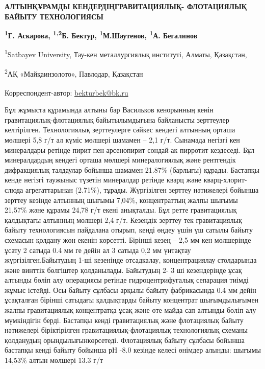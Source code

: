 

{\bfseries АЛТЫНҚҰРАМДЫ КЕНДЕРДІҢГРАВИТАЦИЯЛЫҚ- ФЛОТАЦИЯЛЫҚ БАЙЫТУ
ТЕХНОЛОГИЯСЫ}

{\bfseries \textsuperscript{1}Г. Аскарова, \textsuperscript{1,2}Б.
Бектур\textsuperscript{\envelope }, \textsuperscript{1}М.Шаутенов,
\textsuperscript{1}А. Бегалинов}

\textsuperscript{1}Satbayev University, Тау-кен металлургиялық
институті, Алматы, Қазақстан,

\textsuperscript{2}АҚ «Майқаинзолото», Павлодар, Қазақстан

{\bfseries \textsuperscript{\envelope }}Корреспондент-автор:
\href{mailto:bekturbek@bk.run}{bekturbek@bk.ru}

Бұл жұмыста құрамында алтыны бар Васильков кенорынның кенін
гравитациялық-флотациялық байытылымдығына байланысты зерттеулер
келтірілген. Технологиялық зерттеулерге сәйкес кендегі алтынның орташа
мөлшері 5,8 г/т ал күміс мөлшері шамамен -- 2,1 г/т. Сынамада негізгі
кен минералдары ретінде пирит пен арсенопирит сондай-ак пирротит
кездеседі. Бұл минералдардың кендегі орташа мөлшері минералогиялық және
рентгендік дифракциялық талдаулар бойынша шамамен 21.87\% (барлығы)
құрады. Бастапқы кенде негізгі таужыныс түзетін минералдар ретінде кварц
және кварц-хлорит-слюда агрегаттарынан (2.71\%), тұрады. Жүргізілген
зерттеу нәтижелері бойынша зерттеу кезінде алтынның шығымы 7,04\%,
концентраттың жалпы шығымы 21,57\% және құрамы 24,78 г/т екені
анықталды. Бұл ретте гравитациялық қалдықтағы алтынның мөлшері 2,4 г/т.
Кезеңдік зерттеу тек гравитациялық байыту технологиясын пайдалана
отырып, кенді өңдеу үшін үш сатылы байыту схемасын қолдану жөн екенін
көрсетті. Бірінші кезең -- 2,5 мм кен мөлшерінде ұсату 2 сатыда 0.4 мм
ге дейін ал 3 сатыда 0,2 мм үнтақтау жүргізілген.Байытудың 1-ші
кезенінде отсадкалау, концентрациялау столдарында және винттік бөлгіштер
қолданылады. Байытудың 2- 3 ші кезендерінде ұсақ алтынды бөліп алу
операциясы ретінде гидроцентрифугалық сепарация тиімді жұмыс істейді.
Осы байыту сұлбасы арқылы байыту фабрикасында 0.4 мм дейін ұсақталған
бірінші сатыдағы қалдықтарды байыту концентрат шығымдылығымен жалпы
гравитациялық концентратқа ұсақ және өте майда сап алтынды бөліп алу
мүмкіндігін берді. Бастапқы кенді гравитациялық және флотациялық байыту
нәтижелері біріктірілген гравитациялық-флотациялық технологиялық схеманы
қолданудың орындылығынкөрсетеді. Флотациялық байыту сұлбасы бойынша
бастапқы кенді байыту бойынша рН -8.0 кезінде келесі өнімдер алынды:
шығымы 14,53\% алтын мөлшері 13.3 г/т

